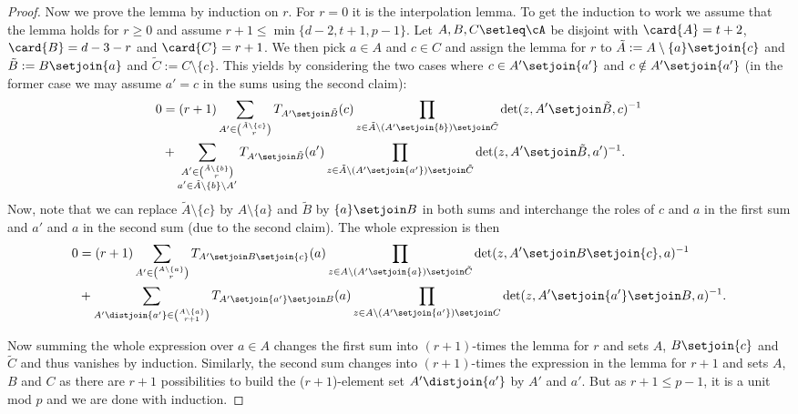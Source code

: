 \begin{proof}
  Now we prove the lemma by induction on $r$. For $r=0$ it is the interpolation lemma.
  To get the induction to work we assume that the lemma holds for $r\geq 0$ and assume $r+1\leq\min\{d-2,t+1,p-1\}$.
  Let $A,B,C\setleq \cA$ be disjoint with $\card{A}=t+2$, $\card{B}=d-3-r$ and $\card{C}=r+1$. We then pick $a\in A$ and $c\in C$ and assign the lemma for $r$ to
  $\tilde{A}:=A\setminus\{a\}\setjoin\{c\}$ and $\tilde{B}:=B\setjoin\{a\}$ and $\tilde{C}:=C\setminus\{c\}$. 
  This yields by considering the two cases where $c\in A'\setjoin\{a'\}$ and $c\notin A'\setjoin\{a'\}$ (in the former case we may assume $a'=c$ in the sums using the second claim):
  \begin{align}
    0 & = (r+1)\sum_{A'\in\binom{\tilde{A}\setminus\{c\}}{r}}{T_{A'\setjoin\tilde{B}}(c)\prod_{z\in \tilde{A}\setminus (A'\setjoin\{b\})\setjoin \tilde{C}}\det(z,A'\setjoin\tilde{B},c)^{-1}}\\
      & + \sum_{\substack{A'\in\binom{\tilde{A}\setminus\{b\}}{r}\\ a'\in \tilde{A}\setminus\{b\}\setminus A'}}{T_{A'\setjoin\tilde{B}}(a')\prod_{z\in \tilde{A}\setminus (A'\setjoin\{a'\})\setjoin \tilde{C}}\det(z,A'\setjoin\tilde{B},a')^{-1}}\text{.}
  \end{align}
  Now, note that we can replace $\tilde{A}\setminus \{c\}$ by $A\setminus\{a\}$ and $\tilde{B}$ by $\{a\}\setjoin B$ in both sums and interchange the roles of $c$ and $a$ in the first sum and $a'$ and $a$ in the second sum (due to the second claim). The whole expression is then
  \begin{align}
    0 & = (r+1)\sum_{A'\in\binom{A\setminus\{a\}}{r}}{T_{A'\setjoin B\setjoin\{c\}}(a)\prod_{z\in A\setminus (A'\setjoin \{a\})\setjoin\tilde{C}}{\det(z,A'\setjoin B\setjoin\{c\},a)^{-1}}}\\
    & + \sum_{A'\distjoin\{a'\}\in\binom{A\setminus\{a\}}{r+1}}{T_{A'\setjoin\{a'\}\setjoin B}(a)\prod_{z\in A\setminus (A'\setjoin\{a'\})\setjoin C}{\det(z,A'\setjoin\{a'\}\setjoin B,a)^{-1}}}\text{.}
  \end{align}

  Now summing the whole expression over $a\in A$ changes the first sum into $(r+1)$-times the lemma for $r$ and sets $A$, $B\setjoin\{c\}$ and $\tilde{C}$ and thus vanishes by induction. Similarly, the second sum changes into $(r+1)$-times the expression in the lemma for $r+1$ and sets $A$, $B$ and $C$ as there are $r+1$ possibilities to build the ($r+1$)-element set $A'\distjoin\{a'\}$ by $A'$ and $a'$. But as $r+1\leq p-1$, it is a unit mod $p$ and we are done with induction.
\end{proof}

